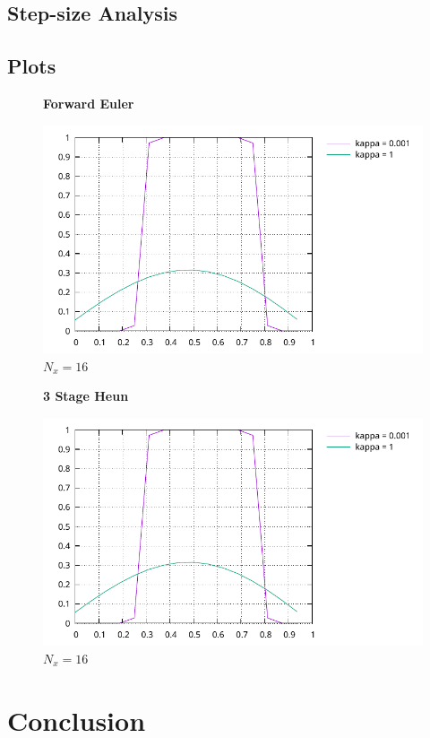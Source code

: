 \documentclass[a4paper,11pt]{article}
\theoremstyle{break}
\theoremstyle{break2}
\theoremstyle{break}
\theoremstyle{break2}
\begin{document}
\subsection{Step-size Analysis}


\subsection{Plots}

\begin{figure}[h]
	\centering
	\textbf{Forward Euler}\par\medskip
	\includegraphics[width=\linewidth]{HE_plot_FE.pdf}
	\caption{$ N_x = 16 $}
\end{figure}

\begin{figure}[h]
	\centering
	\textbf{3 Stage Heun}\par\medskip
	\includegraphics[width=\linewidth]{HE_plot_Heun3.pdf}
	\caption{$ N_x = 16 $}
\end{figure}
\section{Conclusion}
\end{document}
